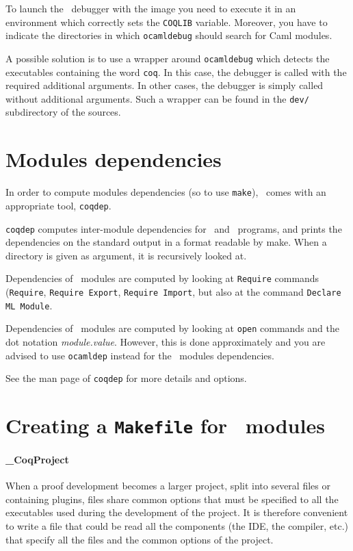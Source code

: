 To launch the \ocaml\ debugger with the image you need to execute it in
an environment which correctly sets the \texttt{COQLIB} variable.
Moreover, you have to indicate the directories in which
\texttt{ocamldebug} should search for Caml modules.

A possible solution is to use a wrapper around \texttt{ocamldebug}
which detects the executables containing the word \texttt{coq}. In
this case, the debugger is called with the required additional
arguments. In other cases, the debugger is simply called without additional
arguments. Such a wrapper can be found in the \texttt{dev/}
subdirectory of the sources. 

\section[Modules dependencies]{Modules dependencies\label{Dependencies}
  }

In order to compute modules dependencies (so to use {\tt make}),
\Coq\ comes with an appropriate tool, {\tt coqdep}.

{\tt coqdep} computes inter-module dependencies for \Coq\ and
\ocaml\ programs, and prints the dependencies on the standard
output in a format readable by make.  When a directory is given as
argument, it is recursively looked at.

Dependencies of \Coq\ modules are computed by looking at {\tt Require}
commands ({\tt Require}, {\tt Requi\-re Export}, {\tt Require Import},
but also at the command {\tt Declare ML Module}.

Dependencies of \ocaml\ modules are computed by looking at
\verb!open! commands and the dot notation {\em module.value}. However,
this is done approximately and you are advised to use {\tt ocamldep}
instead for the \ocaml\ modules dependencies.

See the man page of {\tt coqdep} for more details and options.


\section[Creating a {\tt Makefile} for \Coq\ modules]{Creating a {\tt Makefile} for \Coq\ modules\label{Makefile}
}

\paragraph{\_CoqProject}
When a proof development becomes a larger project, split into several
files or containing {\ocaml} plugins, files share common options that
must be specified to all the executables used during the development
of the project. It is therefore convenient to write a file that could
be read all the components (the IDE, the compiler, etc.) that
specify all the files and the common options of the project.

